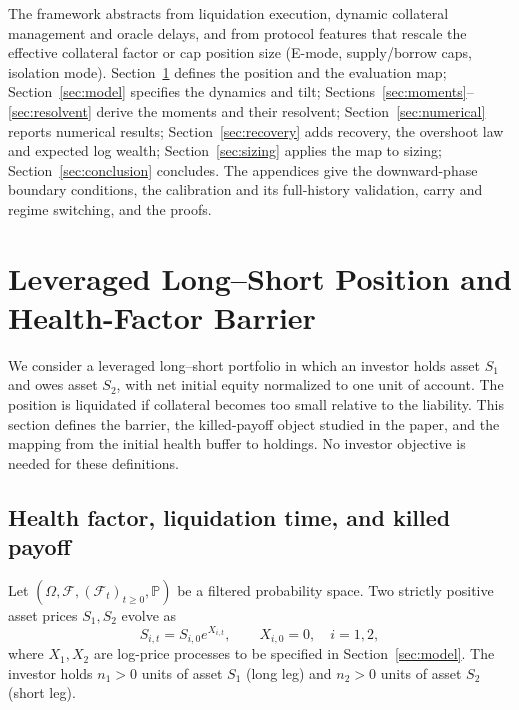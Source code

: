\documentclass[11pt]{article}
\renewcommand{\P}{\mathbb{P}}
\newcommand{\F}{\mathcal{F}}
\theoremstyle{plain}
\theoremstyle{definition}
\theoremstyle{remark}
\begin{document}
The framework abstracts from liquidation execution, dynamic collateral management and oracle
delays, and from protocol features that rescale the effective collateral factor or cap position
size (E-mode, supply/borrow caps, isolation mode). Section~\ref{sec:setup} defines the position and
the evaluation map; Section~\ref{sec:model} specifies the dynamics and tilt;
Sections~\ref{sec:moments}--\ref{sec:resolvent} derive the moments and their resolvent;
Section~\ref{sec:numerical} reports numerical results; Section~\ref{sec:recovery} adds recovery,
the overshoot law and expected log wealth; Section~\ref{sec:sizing} applies the map to sizing;
Section~\ref{sec:conclusion} concludes. The appendices give the downward-phase boundary conditions,
the calibration and its full-history validation, carry and regime switching, and the proofs.

\section{Leveraged Long--Short Position and Health-Factor Barrier}\label{sec:setup}

We consider a leveraged long--short portfolio in which an investor holds asset $S_1$
and owes asset $S_2$, with net initial equity normalized to one unit of account. The
position is liquidated if collateral becomes too small relative to the liability. This
section defines the barrier, the killed-payoff object studied in the paper, and the mapping
from the initial health buffer to holdings. No investor objective is needed for these
definitions.

\subsection{Health factor, liquidation time, and killed payoff}
Let $(\Omega,\F,(\F_t)_{t\ge 0},\P)$ be a filtered probability space.
Two strictly positive asset prices $S_1,S_2$ evolve as
\[
S_{i,t}=S_{i,0}e^{X_{i,t}},\qquad X_{i,0}=0,\quad i=1,2,
\]
where $X_1,X_2$ are log-price processes to be specified in Section~\ref{sec:model}.
The investor holds $n_1>0$ units of asset $S_1$ (long leg) and $n_2>0$ units of asset $S_2$ (short leg).
\end{document}
